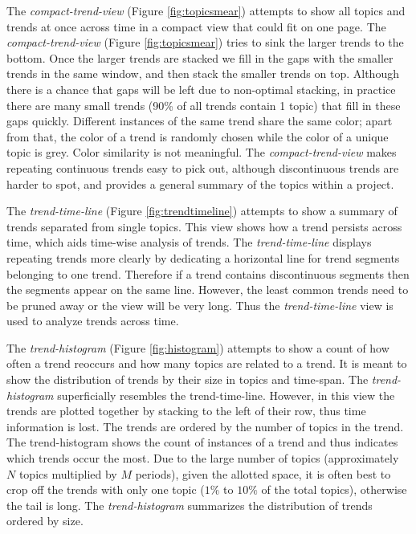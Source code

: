 \documentclass[times, 10pt,twocolumn]{article}
\begin{document}
 The \emph{compact-trend-view} (Figure \ref{fig:topicsmear})
  attempts to show all topics and trends at once across time in a
  compact view that could fit on one page.   The
\emph{compact-trend-view} (Figure \ref{fig:topicsmear}) tries to sink
the larger trends to the bottom.  Once the larger trends are stacked
we fill in the gaps with the smaller trends in the same window, and
then stack the smaller trends on top.  Although there is a chance that
gaps will be left due to non-optimal stacking, in practice there are
many small trends (90\% of all trends contain 1 topic) that fill in
these gaps quickly.  Different instances of the same trend share the
same color; apart from that, the color of a trend is randomly chosen
while the color of a unique topic is grey. Color similarity is not meaningful.  
The \emph{compact-trend-view} makes repeating
continuous trends easy to pick out, although discontinuous trends are
harder to spot, and provides a general summary of the topics within a project.

The \emph{trend-time-line} (Figure \ref{fig:trendtimeline})
attempts to show a summary of trends separated from single topics. This view shows how a trend persists across time, which aids time-wise analysis of trends.
The \emph{trend-time-line} displays repeating trends more clearly by
dedicating a horizontal line for trend segments belonging to one
trend. Therefore if a trend contains discontinuous segments then
the segments appear on the same line.  However, the least common
trends need to be pruned away or the view will be very long. 
Thus the \emph{trend-time-line} view is used to analyze trends across time.

 The \emph{trend-histogram} (Figure \ref{fig:histogram}) attempts
  to show a count of how often a trend reoccurs and how many topics
  are related to a trend. It is meant to show the distribution of
  trends by their size in topics and time-span.  The
\emph{trend-histogram} superficially resembles the trend-time-line.
However, in this view the trends are plotted together by stacking to
the left of their row, thus time information is lost.  The trends are
ordered by the number of topics in the trend.  The trend-histogram
shows the count of instances of a trend and thus indicates which
trends occur the most. Due to the large number of topics
(approximately $N$ topics multiplied by $M$ periods), given the
allotted space, it is often best to crop off the trends with only one
topic ($1\%$ to $10\%$ of the total topics), otherwise the tail is
long. The \emph{trend-histogram} summarizes the distribution of
trends ordered by size.
\end{document}
